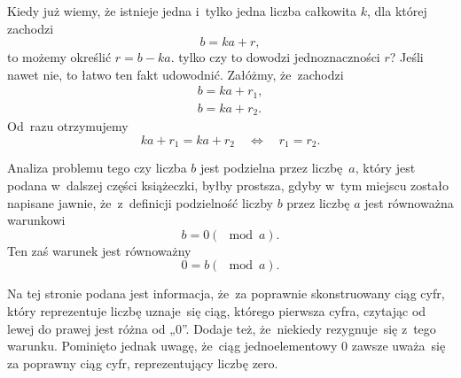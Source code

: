 \documentclass[a4paper,11pt]{article}
\numberwithin{equation}{section}
\begin{document}
\vspace{\spaceFour}





\noindent
{} Kiedy już wiemy, że istnieje jedna i~tylko jedna liczba całkowita
$k$, dla której zachodzi
\begin{equation}
  \label{eq:Gancarzewicz-Arytmetyka-04}
  b = k a + r,
\end{equation}
to możemy określić $r = b - k a$. tylko czy to dowodzi jednoznaczności $r$?
Jeśli nawet nie, to łatwo ten fakt udowodnić. Załóżmy, że~zachodzi
\begin{subequations}
  \begin{align}
    \label{eq:Gancarzewicz-Arytmetyka-05-A}
    b = k a + r_{ 1 }, \\
    \label{eq:Gancarzewicz-Arytmetyka-05-B}
    b = k a + r_{ 2 }.
  \end{align}
\end{subequations}
Od~razu otrzymujemy
\begin{equation}
  \label{eq:Gancarzewicz-Arytmetyka-06}
  k a + r_{ 1 } = k a + r_{ 2 } \quad \iff \quad r_{ 1 } = r_{ 2 }.
\end{equation}

\vspace{\spaceFour}





 Analiza problemu tego czy liczba $b$ jest podzielna przez
liczbę~$a$, który jest podana w~dalszej części książeczki, byłby prostsza,
gdyby w~tym miejscu zostało napisane jawnie, że~z~definicji podzielność
liczby $b$ przez liczbę $a$ jest równoważna warunkowi
\begin{equation}
  \label{eq:Gancarzewicz-Arytmetyka-07}
  b = 0 ( \mod a ).
\end{equation}
Ten zaś warunek jest równoważny
\begin{equation}
  \label{eq:Gancarzewicz-Arytmetyka-08}
  0 = b ( \mod a ).
\end{equation}

\vspace{\spaceFour}





\noindent
{} Na tej stronie podana jest informacja, że~za poprawnie
skonstruowany ciąg cyfr, który reprezentuje liczbę uznaje~się ciąg, którego
pierwsza cyfra, czytając od lewej do prawej jest różna od „$0$”.
Dodaje też, że~niekiedy rezygnuje~się z~tego warunku. Pominięto jednak
uwagę, że~ciąg jednoelementowy $0$ zawsze uważa~się za poprawny ciąg cyfr,
reprezentujący liczbę zero.
\end{document}
